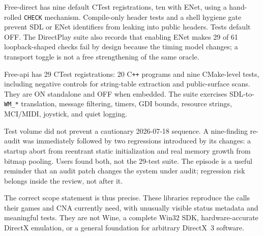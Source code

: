 Free-direct has nine default CTest registrations, ten with ENet, using a hand-rolled
\texttt{CHECK} mechanism. Compile-only header tests and a shell hygiene gate prevent SDL or
ENet identifiers from leaking into public headers. Tests default OFF. The DirectPlay suite
also records that enabling ENet makes 29 of 61 loopback-shaped checks fail by design because
the timing model changes; a transport toggle is not a free strengthening of the same oracle.

Free-api has 29 CTest registrations: 20 C\texttt{++} programs and nine CMake-level tests,
including negative controls for string-table extraction and public-surface scans. They are ON
standalone and OFF when embedded. The suite exercises SDL-to-\texttt{WM\_*} translation,
message filtering, timers, GDI bounds, resource strings, MCI/MIDI, joystick, and quiet logging.

Test volume did not prevent a cautionary 2026-07-18 sequence. A nine-finding re-audit was
immediately followed by two regressions introduced by its changes: a startup abort from
reentrant static initialization and real memory growth from bitmap pooling. Users found both,
not the 29-test suite. The episode is a useful reminder that an audit patch changes the system
under audit; regression risk belongs inside the review, not after it.

The correct scope statement is thus precise. These libraries reproduce the calls their games
and CNA currently need, with unusually visible status metadata and meaningful tests. They are
not Wine, a complete Win32 SDK, hardware-accurate DirectX emulation, or a general foundation for
arbitrary DirectX~3 software.

